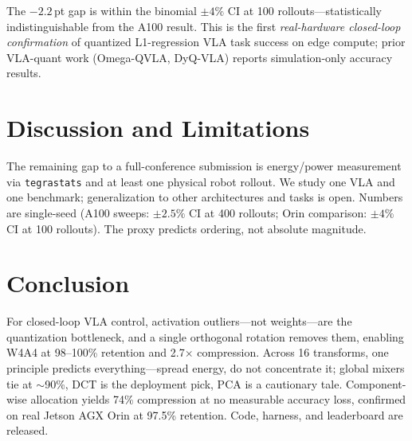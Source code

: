 \documentclass[conference]{IEEEtran}
\begin{document}
The $-2.2$\,pt gap is within the binomial $\pm4\%$ CI at 100 rollouts---statistically
indistinguishable from the A100 result. This is the first \emph{real-hardware closed-loop
confirmation} of quantized L1-regression VLA task success on edge compute; prior VLA-quant
work (Omega-QVLA, DyQ-VLA) reports simulation-only accuracy results.

\section{Discussion and Limitations}

The remaining gap to a full-conference submission is energy/power measurement via
\texttt{tegrastats} and at least one physical robot rollout. We study one VLA and one benchmark;
generalization to other architectures and tasks is open. Numbers are single-seed (A100 sweeps:
$\pm2.5\%$ CI at 400 rollouts; Orin comparison: $\pm4\%$ CI at 100 rollouts). The proxy predicts
ordering, not absolute magnitude.

\section{Conclusion}

For closed-loop VLA control, activation outliers---not weights---are the quantization bottleneck,
and a single orthogonal rotation removes them, enabling W4A4 at 98--100\% retention and 2.7$\times$
compression. Across 16 transforms, one principle predicts everything---spread energy, do not
concentrate it; global mixers tie at $\sim$90\%, DCT is the deployment pick, PCA is a cautionary
tale. Component-wise allocation yields 74\% compression at no measurable accuracy loss, confirmed
on real Jetson AGX Orin at 97.5\% retention. Code, harness, and leaderboard are released.
\end{document}
